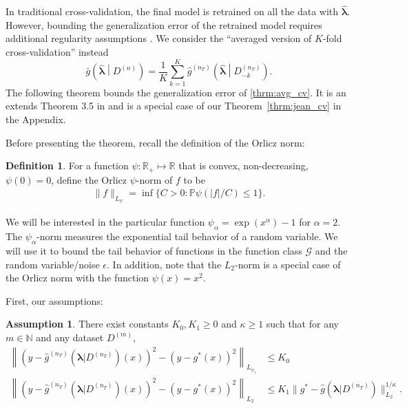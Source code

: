 \documentclass[12pt]{article} %
\theoremstyle{definition}
\newtheorem{definition}{Definition}
\newtheorem{assump}{Assumption}
\begin{document}
In traditional cross-validation, the final model is retrained on all the data with $\hat{\boldsymbol{\lambda}}$. However, bounding the generalization error of the retrained model requires additional regularity assumptions \citep{lecue2012oracle}. We consider the ``averaged version of $K$-fold cross-validation'' instead
\begin{equation}
\label{thrm:avg_cv}
\bar{g}\left ( \hat{\boldsymbol \lambda} \middle | {D^{(n)}} \right ) = 
\frac{1}{K} \sum_{k=1}^K 
\hat{g}^{(n_T)} \left (\hat{\boldsymbol \lambda} \middle | D^{(n_T)}_{-k} \right ).
\end{equation}
The following theorem bounds the generalization error of \eqref{thrm:avg_cv}. It is an extends Theorem 3.5 in \citet{lecue2012oracle} and is a special case of our Theorem~\ref{thrm:jean_cv} in the Appendix.

Before presenting the theorem, recall the definition of the Orlicz norm:
\begin{definition}
	For a function $\psi: \mathbb{R}_+ \mapsto \mathbb{R}$ that is convex, non-decreasing, $\psi(0) = 0$, define the Orlicz $\psi$-norm of $f$ to be
	\begin{align}
	\|f\|_{L_\psi} = \inf \{C > 0: \mathbb{P}\psi(|f|/C) \le 1\}.
	\end{align}
\end{definition}
We will be interested in the particular function $\psi_\alpha = \exp(x^\alpha) - 1 $ for $\alpha = 2$.
The $\psi_\alpha$-norm measures the exponential tail behavior of a random variable.
We will use it to bound the tail behavior of functions in the function class $\mathcal{G}$ and the random variable/noise $\epsilon$.
In addition, note that the $L_2$-norm is a special case of the Orlicz norm with the function $\psi(x) = x^2$.

First, our assumptions:
\begin{assump}
	\label{assump:tail_margin}
	There exist constants $K_0, K_1 \ge 0$ and $\kappa \ge 1$ such that for any $m \in \mathbb{N}$ and any dataset $D^{(m)}$,
	\begin{align}
	\left \|
	\left(
	y - \hat{g}^{(n_T)}(\boldsymbol{\lambda} | D^{(n_T)})(x)
	\right)^2
	- \left(
	y - g^*(x)
	\right)^2 \right \|_{L_{\psi_1}} & \le K_0
	\label{eq:cv_assump1}\\
	\left \|
	\left(
	y - \hat{g}^{(n_T)}(\boldsymbol{\lambda} | D^{(n_T)})(x)
	\right)^2
	- \left(
	y - g^*(x)
	\right)^2
	\right \|_{L_2}
	& \le 
	K_1 \|g^{*}-\hat{g}(\boldsymbol{\lambda}|D^{(n_{T})})\|_{L_{2}}^{1/\kappa}.
	\label{eq:cv_assump2}
	\end{align}
\end{assump}
\end{document}
